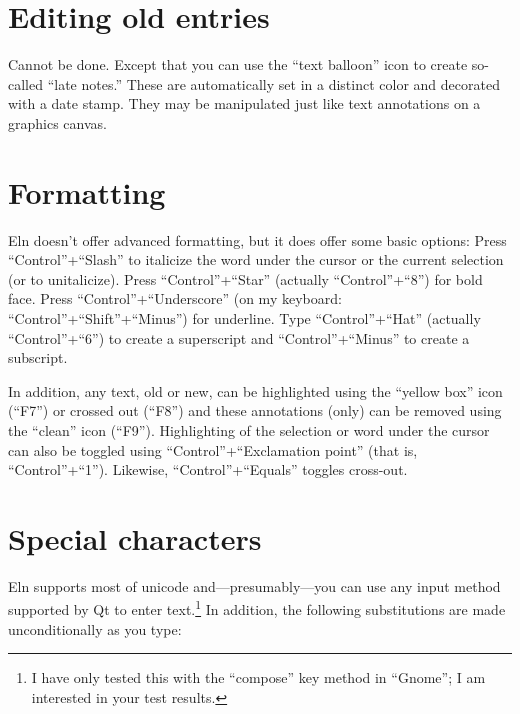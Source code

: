 \documentclass[11pt]{report}
\begin{document}
\section{Editing old entries}

Cannot be done. Except that you can use the ``text balloon'' icon to
create so-called ``late notes.'' These are automatically set in a
distinct color and decorated with a date stamp. They
may be manipulated just like text annotations on a graphics canvas.

\section{Formatting}

Eln doesn't offer advanced formatting, but it does offer some basic
options: Press ``Control''+``Slash'' to italicize the word under the
cursor or the current selection (or to unitalicize). Press
``Control''+``Star'' (actually ``Control''+``8'') for bold face. Press
``Control''+``Underscore'' (on my keyboard:
``Control''+``Shift''+``Minus'') for underline. Type
``Control''+``Hat'' (actually ``Control''+``6'') to create a
superscript and ``Control''+``Minus'' to create a subscript.

In addition, any text, old or new, can be highlighted using the
``yellow box'' icon (``F7'') or crossed out (``F8'') and these
annotations (only) can be removed using the ``clean'' icon
(``F9''). Highlighting of the selection or word under the cursor can
also be toggled using ``Control''+``Exclamation point'' (that is,
``Control''+``1''). Likewise, ``Control''+``Equals'' toggles
cross-out.

\section{Special characters}

Eln supports most of unicode and---presumably---you can use any input
method supported by Qt to enter text.\footnote{I have only tested this
  with the ``compose'' key method in ``Gnome''; I am interested in
  your test results.} In addition, the following substitutions are
made unconditionally as you type:\medskip
\end{document}
